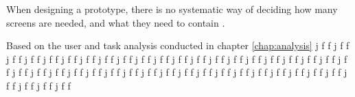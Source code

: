 When designing a prototype, there is no systematic way of deciding how many screens are needed, and what they need to contain \cite{lauesen}.


Based on the user and task analysis conducted in chapter \ref{chap:analysis}
j f f
j f f
j f f
j f f
j f f
j f f
j f f
j f f
j f f
j f f
j f f
j f f
j f f
j f f
j f f
j f f
j f f
j f f
j f f
j f f
j f f
j f f
j f f
j f f
j f f
j f f
j f f
j f f
j f f
j f f
j f f
j f f
j f f
j f f
j f f
j f f
j f f
j f f
j f f
j f f
j f f
j f f
j f f
